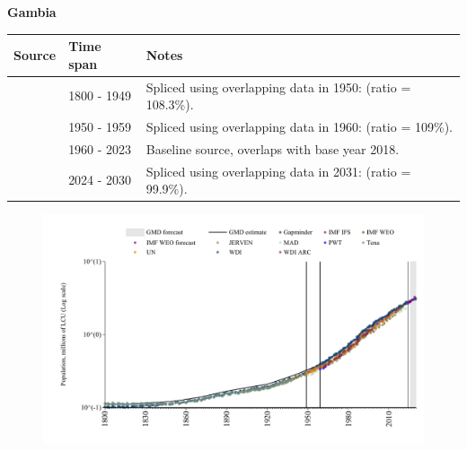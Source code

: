 \documentclass[12pt,a4paper,landscape]{article}
\begin{document}
\begin{adjustbox}{max totalsize={\paperwidth}{\paperheight},center}
\begin{minipage}[t][\textheight][t]{\textwidth}
\vspace*{0.5cm}
{}
\begin{center}
{\Large\bfseries Gambia}
\end{center}
\vspace{0.5cm}
\begin{table}[H]
\centering
\small
\begin{tabular}{|l|l|l|}
\hline
\textbf{Source} & \textbf{Time span} & \textbf{Notes} \\
\hline
\rowcolor{white}\cite{Gapminder}& 1800 - 1949 &Spliced using overlapping data in 1950: (ratio = 108.3\%).\\
\rowcolor{lightgray}\cite{IMF_IFS}& 1950 - 1959 &Spliced using overlapping data in 1960: (ratio = 109\%).\\
\rowcolor{white}\cite{WDI}& 1960 - 2023 &Baseline source, overlaps with base year 2018.\\
\rowcolor{lightgray}\cite{Gapminder}& 2024 - 2030 &Spliced using overlapping data in 2031: (ratio = 99.9\%).\\
\hline
\end{tabular}
\end{table}
\begin{figure}[H]
\centering
\includegraphics[width=\textwidth,height=0.6\textheight,keepaspectratio]{graphs/GMB_pop.pdf}
\end{figure}
\end{minipage}
\end{adjustbox}
\end{document}
